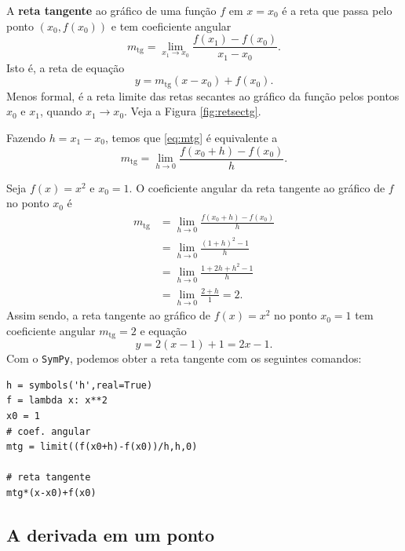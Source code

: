 A {\bf reta tangente} ao gráfico de uma função $f$ em $x=x_0$ é a reta que passa pelo ponto $(x_0, f(x_0))$ e tem coeficiente angular
\begin{equation}\label{eq:mtg}
  m_{\text{tg}} = \lim_{x_1\to x_0} \frac{f(x_1)-f(x_0)}{x_1-x_0}.
\end{equation}
Isto é, a reta de equação
\begin{equation}
  y = m_{\text{tg}}(x-x_0)+f(x_0).
\end{equation}
Menos formal, é a reta limite das retas secantes ao gráfico da função pelos pontos $x_0$ e $x_1$, quando $x_1\to x_0$. Veja a Figura \ref{fig:retsectg}.

\begin{obs}
  Fazendo $h = x_1-x_0$, temos que \eqref{eq:mtg} é equivalente a
  \begin{equation}
    m_{\text{tg}} = \lim_{h\to 0} \frac{f(x_0+h)-f(x_0)}{h}.
  \end{equation}
\end{obs}

\begin{ex}
  Seja $f(x)=x^2$ e $x_0 = 1$. O coeficiente angular da reta tangente ao gráfico de $f$ no ponto $x_0$ é
  \begin{align}
    m_{\text{tg}} &= \lim_{h\to 0} \frac{f(x_0+h)-f(x_0)}{h}\\
                  &= \lim_{h\to 0} \frac{(1+h)^2-1}{h}\\
                  &= \lim_{h\to 0} \frac{1+2h+h^2-1}{h}\\
                  &= \lim_{h\to 0} \frac{2+h}{1} = 2.
  \end{align}
  Assim sendo, a reta tangente ao gráfico de $f(x)=x^2$ no ponto $x_0=1$ tem coeficiente angular $m_{\text{tg}} = 2$ e equação
  \begin{equation}
    y = 2(x-1)+1 = 2x-1.
  \end{equation}
  \ifispython
  Com o \verb+SymPy+, podemos obter a reta tangente com os seguintes comandos:
\begin{verbatim}
h = symbols('h',real=True)
f = lambda x: x**2
x0 = 1
# coef. angular
mtg = limit((f(x0+h)-f(x0))/h,h,0)

# reta tangente
mtg*(x-x0)+f(x0)
\end{verbatim}
  \fi
\end{ex}

\subsection{A derivada em um ponto}

